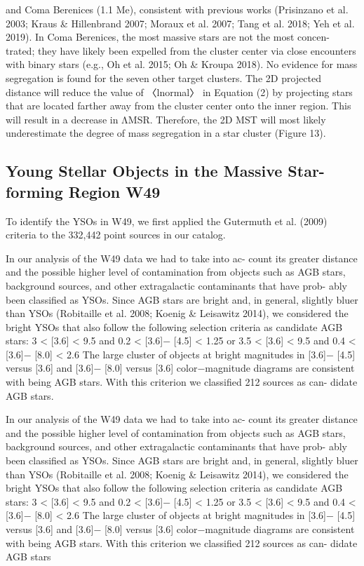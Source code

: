 \documentclass[../main.tex]{subfiles}
\begin{document}
{and Coma Berenices (1.1 Me), consistent with previous works
(Prisinzano et al. 2003; Kraus & Hillenbrand 2007; Moraux
et al. 2007; Tang et al. 2018; Yeh et al. 2019). In Coma
Berenices, the most massive stars are not the most concen-
trated; they have likely been expelled from the cluster center
via close encounters with binary stars (e.g., Oh et al. 2015; Oh
& Kroupa 2018). No evidence for mass segregation is found
for the seven other target clusters.
The 2D projected distance will reduce the value of 〈lnormal〉
in Equation (2) by projecting stars that are located farther away
from the cluster center onto the inner region. This will result in
a decrease in ΛMSR. Therefore, the 2D MST will most likely
underestimate the degree of mass segregation in a star cluster
(Figure 13).

\subsection{Young Stellar Objects in the Massive Star-forming Region W49}


To identify the YSOs in W49, we first applied the
Gutermuth et al. (2009) criteria to the 332,442 point sources
in our catalog.

In our analysis of the W49 data we had to take into ac-
count its greater distance and the possible higher level of
contamination from objects such as AGB stars, background
sources, and other extragalactic contaminants that have prob-
ably been classified as YSOs. Since AGB stars are bright and,
in general, slightly bluer than YSOs (Robitaille et al. 2008;
Koenig & Leisawitz 2014), we considered the bright YSOs
that also follow the following selection criteria as candidate
AGB stars:
3 < [3.6] < 9.5 and 0.2 < [3.6]− [4.5] < 1.25
or
3.5 < [3.6] < 9.5 and 0.4 < [3.6]− [8.0] < 2.6
The large cluster of objects at bright magnitudes in
	[3.6]− [4.5] versus [3.6] and [3.6]− [8.0] versus [3.6]
color−magnitude diagrams are consistent with being AGB
stars. With this criterion we classified 212 sources as can-
didate AGB stars.


In our analysis of the W49 data we had to take into ac-
count its greater distance and the possible higher level of
contamination from objects such as AGB stars, background
sources, and other extragalactic contaminants that have prob-
ably been classified as YSOs. Since AGB stars are bright and,
in general, slightly bluer than YSOs (Robitaille et al. 2008;
Koenig & Leisawitz 2014), we considered the bright YSOs
that also follow the following selection criteria as candidate
AGB stars:
3 < [3.6] < 9.5 and 0.2 < [3.6]− [4.5] < 1.25
or
3.5 < [3.6] < 9.5 and 0.4 < [3.6]− [8.0] < 2.6
The large cluster of objects at bright magnitudes in
	[3.6]− [4.5] versus [3.6] and [3.6]− [8.0] versus [3.6]
color−magnitude diagrams are consistent with being AGB
stars. With this criterion we classified 212 sources as can-
didate AGB stars

}
\end{document}
